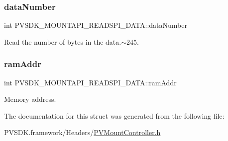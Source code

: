\subsubsection{\texorpdfstring{data\+Number}{dataNumber}}
{\footnotesize\ttfamily int P\+V\+S\+D\+K\+\_\+\+M\+O\+U\+N\+T\+A\+P\+I\+\_\+\+R\+E\+A\+D\+S\+P\+I\+\_\+\+D\+A\+T\+A\+::data\+Number}



Read the number of bytes in the data.$\sim$245. 

\mbox{\label{struct_p_v_s_d_k___m_o_u_n_t_a_p_i___r_e_a_d_s_p_i___d_a_t_a_ae12dde2fcdf659be7a0642ed6c5511aa}} 
\subsubsection{\texorpdfstring{ram\+Addr}{ramAddr}}
{\footnotesize\ttfamily int P\+V\+S\+D\+K\+\_\+\+M\+O\+U\+N\+T\+A\+P\+I\+\_\+\+R\+E\+A\+D\+S\+P\+I\+\_\+\+D\+A\+T\+A\+::ram\+Addr}



Memory address. 



The documentation for this struct was generated from the following file\+:\begin{DoxyCompactItemize}
\item 
P\+V\+S\+D\+K.\+framework/\+Headers/\hyperlink{_p_v_mount_controller_8h}{P\+V\+Mount\+Controller.\+h}\end{DoxyCompactItemize}
